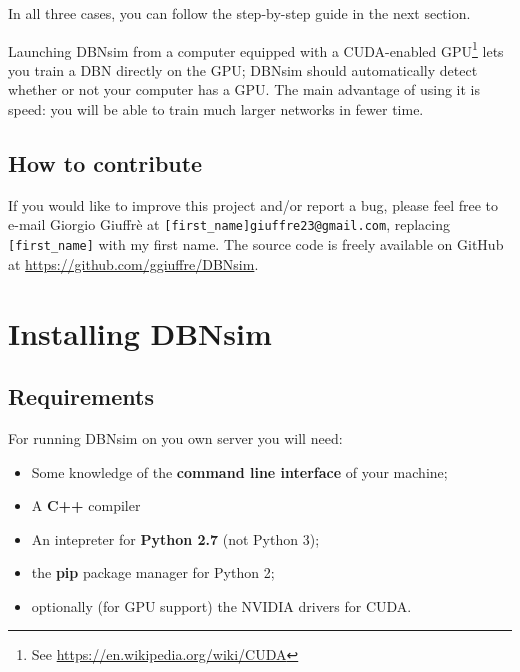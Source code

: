 \documentclass[a4paper]{article}
\begin{document}
In all three cases, you can follow the step-by-step guide in the next section.

Launching DBNsim from a computer equipped with a CUDA-enabled GPU\footnote{See \url{https://en.wikipedia.org/wiki/CUDA}} lets you train a DBN directly on the GPU; DBNsim should automatically detect whether or not your computer has a GPU. The main advantage of using it is speed: you will be able to train much larger networks in fewer time.


\subsection{How to contribute}

If you would like to improve this project and/or report a bug, please feel free to e-mail Giorgio Giuffrè at \texttt{[first\_name]giuffre23@gmail.com}, replacing \texttt{[first\_name]} with my first name. The source code is freely available on GitHub at \url{https://github.com/ggiuffre/DBNsim}.



		
	\section{Installing DBNsim}


		
	\subsection{Requirements}

		
For running DBNsim on you own server you will need:
		
	\begin{itemize}
		
			
	\item Some knowledge of the \textbf{command line interface} of your machine;
			
	\item A \textbf{C++} compiler
			
	\item An intepreter for \textbf{Python 2.7} (not Python 3);
			
	\item the \textbf{pip} package manager for Python 2;
			
	\item optionally (for GPU support) the NVIDIA drivers for CUDA.
		
	\end{itemize}
\end{document}
